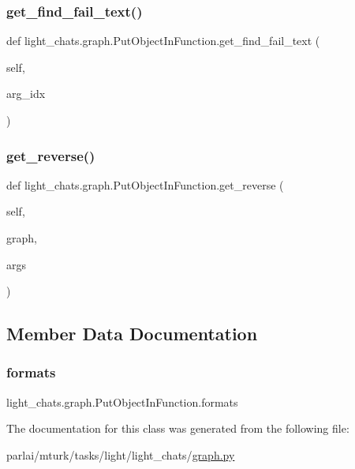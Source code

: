 \subsubsection{\texorpdfstring{get\+\_\+find\+\_\+fail\+\_\+text()}{get\_find\_fail\_text()}}
{\footnotesize\ttfamily def light\+\_\+chats.\+graph.\+Put\+Object\+In\+Function.\+get\+\_\+find\+\_\+fail\+\_\+text (\begin{DoxyParamCaption}\item[{}]{self,  }\item[{}]{arg\+\_\+idx }\end{DoxyParamCaption})}

\mbox{\label{classlight__chats_1_1graph_1_1PutObjectInFunction_a2e1c568fb874c53d06f12f0fc4349713}} 
\subsubsection{\texorpdfstring{get\+\_\+reverse()}{get\_reverse()}}
{\footnotesize\ttfamily def light\+\_\+chats.\+graph.\+Put\+Object\+In\+Function.\+get\+\_\+reverse (\begin{DoxyParamCaption}\item[{}]{self,  }\item[{}]{graph,  }\item[{}]{args }\end{DoxyParamCaption})}



\subsection{Member Data Documentation}
\mbox{\label{classlight__chats_1_1graph_1_1PutObjectInFunction_ad244ff0f442d2c6b785022457e330040}} 
\subsubsection{\texorpdfstring{formats}{formats}}
{\footnotesize\ttfamily light\+\_\+chats.\+graph.\+Put\+Object\+In\+Function.\+formats}



The documentation for this class was generated from the following file\+:\begin{DoxyCompactItemize}
\item 
parlai/mturk/tasks/light/light\+\_\+chats/\hyperlink{parlai_2mturk_2tasks_2light_2light__chats_2graph_8py}{graph.\+py}\end{DoxyCompactItemize}
